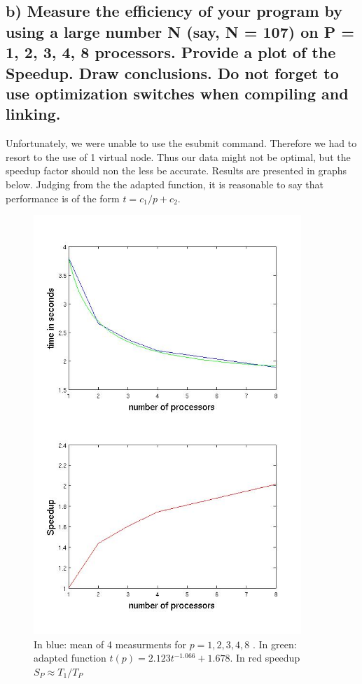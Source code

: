 \subsection*{b) Measure the efficiency of your program by using a large number N (say, N = 107) on P = 1, 2, 3, 4, 8 processors. Provide a plot of the Speedup. Draw conclusions. Do not forget to use optimization switches when compiling and linking.}

Unfortunately, we were unable to use the esubmit command. Therefore we had to resort to the use of 1 virtual node. Thus our data might not be optimal, but the speedup factor should non the less be accurate. Results are presented in graphs below. Judging from the the adapted function, it is reasonable to say that performance is of the form $t = c_1/p+c_2 $.

\begin{figure}[H]
\centering
\includegraphics[width=0.9\textwidth ]{img/Data.jpg}
\caption{In blue: mean of 4 measurments for $p = 1,2,3,4,8$ . In green: adapted function $t(p)=2.123t^{-1.066}+1.678$. In red speedup $S_P  \approx T_1/T_P$}
\end{figure}